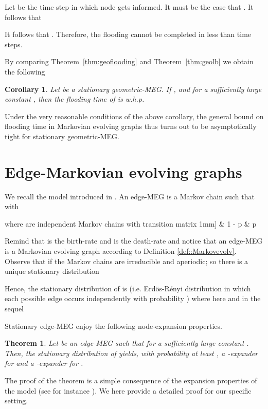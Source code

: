 \documentclass[10pt,a4paper]{article}
\newtheorem{theorem}[definition]{Theorem}
\newtheorem{cor}[definition]{Corollary}
\newcommand{\qed}{\hspace{\stretch{1}}}
\begin{document}
\noindent Let  be the time step in which node  gets informed. It must be the case that . It follows that

It follows that . Therefore, the flooding cannot be completed
in less than  time steps.
\qed


\noindent By comparing Theorem~\ref{thm:geoflooding} and Theorem~\ref{thm:geolb} we obtain the following

\begin{cor}\label{cor:geotight}
Let  be a stationary geometric-MEG. If  , and  for a
sufficiently large constant , then the  flooding time of  is w.h.p.

\end{cor}


\noindent Under the very reasonable conditions of the above corollary, the general bound on flooding time in Markovian evolving graphs thus turns out to be asymptotically tight for stationary geometric-MEG.


\section{Edge-Markovian evolving graphs}\label{sec::edge}
We recall the model introduced in \cite{CMMPS08,W80}. An edge-MEG  is a Markov chain such that   with

where     are independent Markov chains  with transition matrix
1mm]
 & 1 - p & p \

\noindent Remind that  is the birth-rate and  is the death-rate and notice that an edge-MEG is a Markovian evolving  graph according to Definition \ref{def::Markovevolv}. Observe that if  the Markov chains  are irreducible and aperiodic; so there is a unique stationary distribution

Hence, the stationary distribution of  is  (i.e. Erd\"os-R\'enyi distribution in which each possible edge occurs independently with probability ) where here and in the sequel


\noindent Stationary edge-MEG enjoy the following node-expansion properties.

\begin{theorem}\label{Marco} Let    be an edge-MEG such that  for a sufficiently large constant . Then, the stationary distribution of   yields, with probability at least , a -expander for   and a -expander for  .
\end{theorem}

\noindent The proof of the  theorem is a simple consequence of the expansion properties of the  model (see for instance \cite{CF07}). We here provide a detailed proof for our specific setting.
\end{document}
